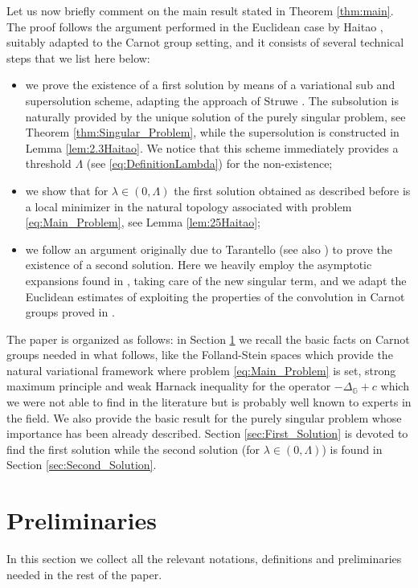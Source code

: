 \documentclass[11pt]{amsart}
\numberwithin{equation}{section} %
\theoremstyle{definition}
\begin{document}
Let us now briefly comment on the main result stated in Theorem \ref{thm:main}. The proof follows the argument performed in the Euclidean case by Haitao \cite{Haitao}, suitably adapted to the Carnot group setting, and it consists of several technical steps that we list here below:
\begin{itemize}
	\item we prove the existence of a first solution by means of a variational sub and supersolution scheme, adapting the approach of Struwe \cite{Struwe}. The subsolution is naturally provided by the unique solution of the purely singular problem, see Theorem \ref{thm:Singular_Problem}, while the supersolution is constructed in Lemma \ref{lem:2.3Haitao}.
	We notice that this scheme immediately provides a threshold $\Lambda$ (see \eqref{eq:DefinitionLambda}) for the non-existence; 
	\item we show that for $\lambda \in (0,\Lambda)$ the first solution obtained as described before is a local minimizer in the natural topology associated with problem \eqref{eq:Main_Problem}, see Lemma \ref{lem:25Haitao};
	\item we follow an argument originally due to Tarantello \cite{Tarantello} (see also \cite{BadTar}) to prove the existence of a second solution. Here we heavily employ the asymptotic expansions found in \cite{Loiudice1}, taking care of the new singular term, and we adapt the Euclidean estimates of \cite{BrezisNirenberg} exploiting the properties of the convolution in Carnot groups proved in \cite{FollandStein}.
\end{itemize} 


\medskip

The paper is organized as follows: in Section \ref{sec:Prel} we recall the basic facts on Carnot groups needed in what follows, like the Folland-Stein spaces which provide the natural variational framework where problem \eqref{eq:Main_Problem} is set, strong maximum principle and weak Harnack inequality for the operator $-\Delta_{\mathbb{G}} + c$ which we were not able to find in the literature but is probably well known to experts in the field. We also provide the basic result for the purely singular problem whose importance has been already described. Section \ref{sec:First_Solution} is devoted to find the first solution while the second solution (for $\lambda \in (0,\Lambda)$) is found in Section \ref{sec:Second_Solution}.





\section{Preliminaries}\label{sec:Prel}
In this section we collect all the relevant notations, definitions and preliminaries needed in the rest of the paper.
\end{document}

